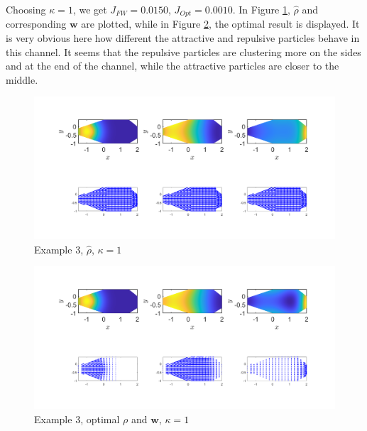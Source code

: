 \documentclass[11pt, a4paper]{article}
\theoremstyle{definition}
\newcommand{\w}{\mathbf{w}}
\begin{document}
Choosing $\kappa = 1$, we get $J_{FW} = 0.0150$, $J_{Opt} = 0.0010$. In Figure \ref{FEx3c}, $\widehat \rho$ and corresponding $\w$ are plotted, while in Figure \ref{FEx3d}, the optimal result is displayed. It is very obvious here how different the attractive and repulsive particles behave in this channel. It seems that the repulsive particles are clustering more on the sides and at the end of the channel, while the attractive particles are closer to the middle.
\begin{figure}[h]
	\centering
	\includegraphics[scale=0.3]{FW31.png}
	\caption{Example 3, $\widehat \rho$, $\kappa = 1$} 
	\label{FEx3c}
\end{figure}
\begin{figure}[h]
	\centering
	\includegraphics[scale=0.3]{Opt31.png}
	\caption{Example 3, optimal $\rho$ and $\w$, $\kappa = 1$} 
	\label{FEx3d}
\end{figure}	
	
	
\end{document}

